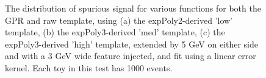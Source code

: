 \begin{figure} 
\begin{center}

\caption{The distribution of spurious signal for various functions for both the GPR and raw template, using (a) the expPoly2-derived 'low' template, (b) the expPoly3-derived 'med' template, (c) the expPoly3-derived 'high' template, extended by 5 GeV on either side and with a 3 GeV wide feature injected, and fit using a linear error kernel. Each toy in this test has 1000 events.}
\label{fig:linearkernel_lowpt_1000_Sig}
\end{center}
\end{figure}

